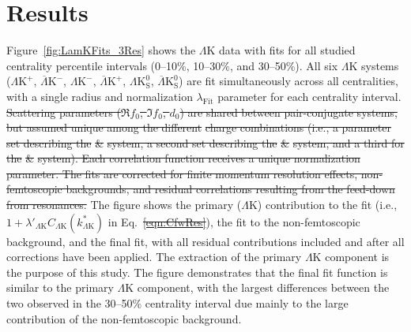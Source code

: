 \documentclass[ALICE,manyauthors]{cernphprep}
\newcommand{\LamK}{$\Lambda$K\xspace}
\newcommand{\LamKchP}{$\Lambda\mathrm{K^{+}}$\xspace}
\newcommand{\ALamKchM}{$\overline{\Lambda}\mathrm{K^{-}}$\xspace}
\newcommand{\LamKchM}{$\Lambda\mathrm{K^{-}}$\xspace}
\newcommand{\ALamKchP}{$\overline{\Lambda}\mathrm{K^{+}}$\xspace}
\newcommand{\LamKs}{$\Lambda\mathrm{K^{0}_{S}}$\xspace}
\newcommand{\ALamKs}{$\overline{\Lambda}\mathrm{K^{0}_{S}}$\xspace}
\providecommand{\DIFaddtex}[1]{{\protect\color{blue}\uwave{#1}}} %
\providecommand{\DIFdeltex}[1]{{\protect\color{red}\sout{#1}}}                      %
\providecommand{\DIFaddbegin}{} %
\providecommand{\DIFaddend}{} %
\providecommand{\DIFdelbegin}{} %
\providecommand{\DIFdelend}{} %
\providecommand{\DIFadd}[1]{\texorpdfstring{\DIFaddtex{#1}}{#1}} %
\providecommand{\DIFdel}[1]{\texorpdfstring{\DIFdeltex{#1}}{}} %
\begin{document}
\section{Results}
\label{sec:Results}

Figure~\ref{fig:LamKFits_3Res} shows the \LamK data with fits for all studied centrality percentile intervals (0--10\%, 10--30\%, and 30--50\%). 
All six \LamK systems (\LamKchP, \ALamKchM, \LamKchM, \ALamKchP, \LamKs, \ALamKs) are fit simultaneously across all centralities, with a single radius and normalization $\lambda_{\mathrm{Fit}}$ parameter for each centrality interval. 
\DIFdelbegin \DIFdel{Scattering parameters ($\Re f_{0}$, $\Im f_{0}$, $d_{0}$) are shared between pair-conjugate systems, but assumed unique among the different }%
\DIFdel{charge combinations (i.e., a parameter set describing the }%
\DIFdel{\& }%
\DIFdel{system, a second set describing the }%
\DIFdel{\& }%
\DIFdel{system, and a third for the }%
\DIFdel{\& }%
\DIFdel{system).
Each correlation function receives a unique normalization parameter.
The fits are corrected for finite momentum resolution effects, non-femtoscopic backgrounds, and residual correlations resulting from the feed-down from resonances.  
}\DIFdelend The figure shows the primary (\LamK) contribution to the fit (i.e., $1 + \lambda'_{\Lambda\mathrm{K}}C_{\Lambda\mathrm{K}}(k^{*}_{\Lambda\mathrm{K}})$ in Eq.~\DIFdelbegin \DIFdel{\ref{eqn:CfwRes}}\DIFdelend \DIFaddbegin \DIFadd{(\ref{eqn:CfwRes})}\DIFaddend ), the fit to the non-femtoscopic background, and the final fit, with all residual contributions included and after all corrections have been applied.
The extraction of the primary \LamK component is the purpose of this study.
The figure demonstrates that the final fit function is similar to the primary \LamK component, with the largest differences between the two observed in the 30--50\% centrality interval due mainly to the large contribution of the non-femtoscopic background.
\end{document}
